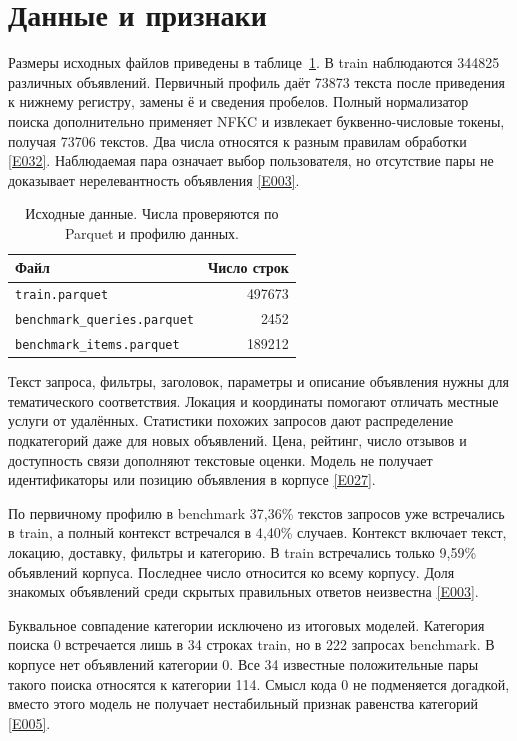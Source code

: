 \documentclass{article}
\newcommand{\ev}[1]{\href{https://github.com/revefffect/avito-contest/blob/main/evidence/INDEX.md\#E#1}{[E#1]}}
\newcommand{\file}[1]{\texttt{\small #1}}
\begin{document}
\section{Данные и признаки}

Размеры исходных файлов приведены в таблице~\ref{tab:data}. В train наблюдаются 344825 различных объявлений. Первичный профиль даёт 73873 текста после приведения к нижнему регистру, замены ё и сведения пробелов. Полный нормализатор поиска дополнительно применяет NFKC и извлекает буквенно-числовые токены, получая 73706 текстов. Два числа относятся к разным правилам обработки \ev{032}. Наблюдаемая пара означает выбор пользователя, но отсутствие пары не доказывает нерелевантность объявления \ev{003}.

\begin{table}[t]
\caption{Исходные данные. Числа проверяются по Parquet и профилю данных.}
\label{tab:data}
\centering
\small
\begin{tabular}{lr}
\toprule
Файл & Число строк \\
\midrule
\file{train.parquet} & 497673 \\
\file{benchmark\_queries.parquet} & 2452 \\
\file{benchmark\_items.parquet} & 189212 \\
\bottomrule
\end{tabular}
\end{table}

Текст запроса, фильтры, заголовок, параметры и описание объявления нужны для тематического соответствия. Локация и координаты помогают отличать местные услуги от удалённых. Статистики похожих запросов дают распределение подкатегорий даже для новых объявлений. Цена, рейтинг, число отзывов и доступность связи дополняют текстовые оценки. Модель не получает идентификаторы или позицию объявления в корпусе \ev{027}.

По первичному профилю в benchmark 37{,}36\% текстов запросов уже встречались в train, а полный контекст встречался в 4{,}40\% случаев. Контекст включает текст, локацию, доставку, фильтры и категорию. В train встречались только 9{,}59\% объявлений корпуса. Последнее число относится ко всему корпусу. Доля знакомых объявлений среди скрытых правильных ответов неизвестна \ev{003}.

Буквальное совпадение категории исключено из итоговых моделей. Категория поиска 0 встречается лишь в 34 строках train, но в 222 запросах benchmark. В корпусе нет объявлений категории 0. Все 34 известные положительные пары такого поиска относятся к категории 114. Смысл кода 0 не подменяется догадкой, вместо этого модель не получает нестабильный признак равенства категорий \ev{005}.
\end{document}
